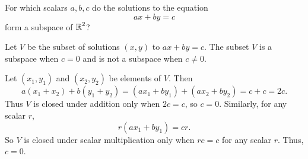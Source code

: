 \documentclass{ximera}
\begin{document}
\begin{exercise} \label{c5.1.7a}
For which scalars $a,b,c$ do the solutions to the equation
\[
ax+by = c
\]
form a subspace of $\mbox{$\Bbb{R}$}^2$?

\begin{solution}

\ans Let $V$ be the subset of solutions $(x,y)$ to $ax + by = c$.
The subset $V$ is a subspace when $c = 0$ and is not a subspace
when $c \neq 0$. 

\soln Let $(x_1,y_1)$ and $(x_2,y_2)$ be elements of $V$.  Then
\[
a(x_1 + x_2) + b(y_1 + y_2) = (ax_1 + by_1) + (ax_2 + by_2) =
c + c = 2c.
\]
Thus $V$ is closed under addition only when $2c = c$, so $c = 0$.
Similarly, for any scalar $r$,
\[
r(ax_1 + by_1) = cr.
\]
So $V$ is closed under scalar multiplication only when $rc = c$ for
any scalar $r$.  Thus, $c = 0$.

\end{solution}
\end{exercise}
\end{document}
